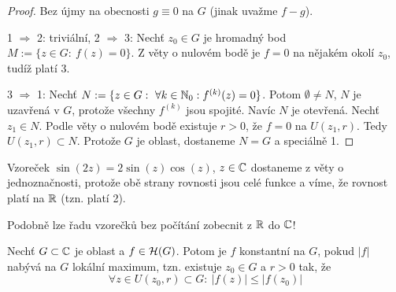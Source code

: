 \begin{proof}
Bez újmy na obecnosti $g \equiv 0$ na $G$ (jinak uvažme $f-g$).

1 $\Rightarrow$ 2: triviální, 2 $\Rightarrow$ 3: Nechť $z_0 \in G$ je hromadný bod $M:=\{z \in G :\ f(z)=0 \}$. Z věty o nulovém bodě je $f=0$ na nějakém okolí $z_0$, tudíž platí 3.

3 $\Rightarrow$ 1: Nechť $N:=\{z \in G: \ \forall k \in \operatorname{\mathbb{N}}_0: f^{(k)}(z)=0 \}$. Potom $\emptyset  \neq N$, $N$ je uzavřená v $G$, protože všechny $f^{(k)}$ jsou spojité. Navíc $N$ je otevřená. Nechť $z_1 \in N$. Podle věty o nulovém bodě existuje $r>0$, že $f=0$ na $U(z_1,r)$. Tedy $U(z_1,r) \subset N$. Protože $G$ je oblast, dostaneme $N=G$ a speciálně 1.
\end{proof}

\begin{example}
Vzoreček $\sin (2z)=2\sin (z) \cos (z)$, $z \in \operatorname{\mathbb{C}}  $ dostaneme z věty o jednoznačnosti, protože obě strany rovnosti jsou celé funkce a víme, že rovnost platí na $\operatorname{\mathbb{R}} $ (tzn. platí 2).
\end{example}

\begin{note}
Podobně lze řadu vzorečků bez počítání zobecnit z $\operatorname{\mathbb{R}} $ do $\operatorname{\mathbb{C}}  $!
\end{note}

\begin{theorem}
Nechť $G \subset \operatorname{\mathbb{C}}  $ je oblast a $f\in \operatorname{\mathcal{H}} (G)$. Potom je $f$ konstantní na $G$, pokud $|f|$ nabývá na $G$ lokální maximum, tzn. existuje $z_0 \in G$ a $r>0$ tak, že 
\begin{equation}
    \forall z \in U(z_0,r) \subset G:\ |f(z)| \leq |f(z_0)|
    \label{eqn:6.8.+}
\end{equation}
\end{theorem}

